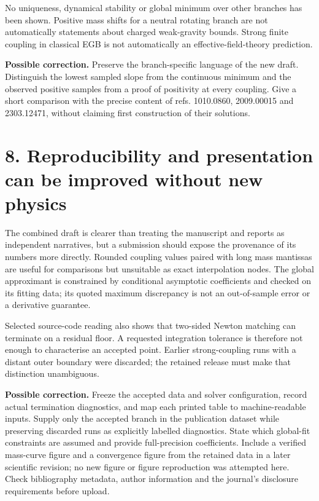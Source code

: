 \documentclass[11pt,a4paper]{article}
\begin{document}
No uniqueness, dynamical stability or global minimum over other branches has been shown. Positive mass shifts for a neutral rotating branch are not automatically statements about charged weak-gravity bounds. Strong finite coupling in classical EGB is not automatically an effective-field-theory prediction.

\textbf{Possible correction.} Preserve the branch-specific language of the new draft. Distinguish the lowest sampled slope from the continuous minimum and the observed positive samples from a proof of positivity at every coupling. Give a short comparison with the precise content of refs. 1010.0860, 2009.00015 and 2303.12471, without claiming first construction of their solutions.

\section*{8. Reproducibility and presentation can be improved without new physics}
The combined draft is clearer than treating the manuscript and reports as independent narratives, but a submission should expose the provenance of its numbers more directly. Rounded coupling values paired with long mass mantissas are useful for comparisons but unsuitable as exact interpolation nodes. The global approximant is constrained by conditional asymptotic coefficients and checked on its fitting data; its quoted maximum discrepancy is not an out-of-sample error or a derivative guarantee.

Selected source-code reading also shows that two-sided Newton matching can terminate on a residual floor. A requested integration tolerance is therefore not enough to characterise an accepted point. Earlier strong-coupling runs with a distant outer boundary were discarded; the retained release must make that distinction unambiguous.

\textbf{Possible correction.} Freeze the accepted data and solver configuration, record actual termination diagnostics, and map each printed table to machine-readable inputs. Supply only the accepted branch in the publication dataset while preserving discarded runs as explicitly labelled diagnostics. State which global-fit constraints are assumed and provide full-precision coefficients. Include a verified mass-curve figure and a convergence figure from the retained data in a later scientific revision; no new figure or figure reproduction was attempted here. Check bibliography metadata, author information and the journal's disclosure requirements before upload.
\end{document}
